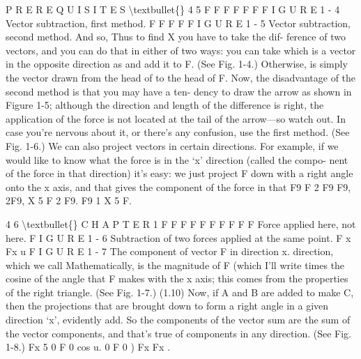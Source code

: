 \documentclass[10pt,oneside]{article}
\begin{document}
P R E R E Q U I S I T E S \textbackslash{}textbullet\{\} 4 5 F F F  F F F F I G U R E 1 - 4 Vector subtraction, first method. F  F F F F I G U R E 1 - 5 Vector subtraction, second method. And so, Thus to find X you have to take the dif- ference of two vectors, and you can do that in either of two ways: you can take which is a vector in the opposite direction as and add it to F. (See Fig. 1-4.) Otherwise, is simply the vector drawn from the head of to the head of F. Now, the disadvantage of the second method is that you may have a ten- dency to draw the arrow as shown in Figure 1-5; although the direction and length of the difference is right, the application of the force is not located at the tail of the arrow---so watch out. In case you’re nervous about it, or there’s any confusion, use the first method. (See Fig. 1-6.) We can also project vectors in certain directions. For example, if we would like to know what the force is in the ‘x’ direction (called the compo- nent of the force in that direction) it’s easy: we just project F down with a right angle onto the x axis, and that gives the component of the force in that F9 F 2 F9 F9, 2F9, X 5 F 2 F9. F9 1 X 5 F.\par

4 6 \textbackslash{}textbullet\{\} C H A P T E R  1 F F F  F F F F  F F F Force applied here, not here. F I G U R E 1 - 6 Subtraction of two forces applied at the same point. F x Fx u F I G U R E 1 - 7 The component of vector F in direction x. direction, which we call Mathematically, is the magnitude of F (which I’ll write times the cosine of the angle that F makes with the x axis; this comes from the properties of the right triangle. (See Fig. 1-7.) (1.10) Now, if A and B are added to make C, then the projections that are brought down to form a right angle in a given direction ‘x’, evidently add. So the components of the vector sum are the sum of the vector components, and that’s true of components in any direction. (See Fig. 1-8.) Fx 5 0 F 0  cos u. 0 F 0 ) Fx Fx .\par
\end{document}
